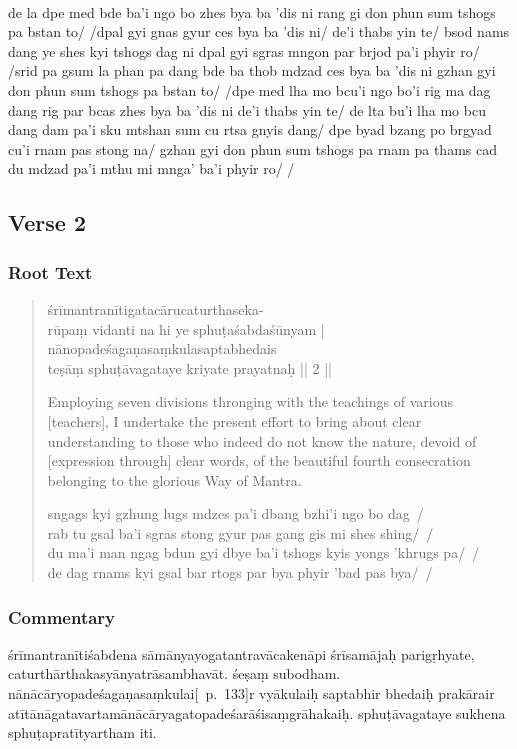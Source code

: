 \documentclass[12pt]{article}
\begin{document}
\textbf{\TVB}\\
de la dpe med bde ba'i ngo bo zhes bya ba 'dis ni rang gi don phun sum tshogs pa bstan to/ /dpal gyi gnas gyur ces bya ba 'dis ni/ de'i thabs yin te/ bsod nams dang ye shes kyi tshogs dag ni dpal gyi sgras mngon par brjod pa'i phyir ro/ /srid pa gsum la phan pa dang bde ba thob mdzad ces bya ba 'dis ni gzhan gyi don phun sum tshogs pa bstan to/ /dpe med lha mo bcu'i ngo bo'i rig ma dag dang rig par bcas zhes bya ba 'dis ni de'i thabs yin te/ de lta bu'i lha mo bcu dang dam pa'i sku mtshan sum cu rtsa gnyis dang/ dpe byad bzang po brgyad cu'i rnam pas stong na/ gzhan gyi don phun sum tshogs pa rnam pa thams cad du mdzad pa'i mthu mi mnga' ba'i phyir ro/ /

\subsection{Verse 2}
\subsubsection{Root Text}
\begin{quote}
	śrīmantranītigatacārucaturthaseka-\\
	rūpaṃ vidanti na hi ye sphuṭaśabdaśūnyam |\\
	nānopadeśagaṇasaṃkulasaptabhedais\\
	teṣāṃ sphuṭāvagataye kriyate prayatnaḥ || 2 ||

	Employing seven divisions thronging with the teachings of various [teachers], I undertake the present effort to bring about clear understanding to those who indeed do not know the nature, devoid of [expression through] clear words, of the beautiful fourth consecration belonging to the glorious Way of Mantra.

	sngags kyi gzhung lugs mdzes pa'i dbang bzhi'i ngo bo dag~/\\
	rab tu gsal ba'i sgras stong gyur pas gang gis mi shes shing/~/\\
	du ma'i man ngag bdun gyi dbye ba'i tshogs kyis yongs 'khrugs pa/~/\\
	de dag rnams kyi gsal bar rtogs par bya phyir 'bad pas bya/~/
\end{quote}

\subsubsection{Commentary}
śrīmantranītiśabdena sāmānyayogatantravācakenāpi śrīsamājaḥ parigṛhyate, caturthārthakasyānyatrāsambhavāt.
śeṣaṃ subodham.
nānācāryopadeśagaṇasaṃkulai\hspace{0em}[\EDD\ p.\ 133]\hspace{0em}r vyākulaiḥ saptabhir bhedaiḥ prakārair atītānāgatavartamānācārya\footnoteB{
	°vartamānā°] \EDD ; °pravartamānā° \MS
}gatopadeśarāśisaṃgrāhakaiḥ.
sphuṭāvagataye sukhena sphuṭapratītyartham iti.\\
\end{document}
